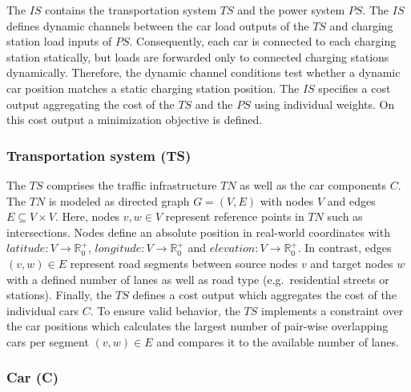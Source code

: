 The $IS$ contains the transportation system $TS$ and the power system $PS$. The $IS$ defines dynamic channels between the car load outputs of the $TS$ and charging station load inputs of $PS$. Consequently, each car is connected to each charging station statically, but loads are forwarded only to connected charging stations dynamically. Therefore, the dynamic channel conditions test whether a dynamic car position matches a static charging station position. The $IS$ specifies a cost output aggregating the cost of the $TS$ and the $PS$ using individual weights. On this cost output a minimization objective is defined.

\subsubsection*{Transportation system (TS)}

The $TS$ comprises the traffic infrastructure $TN$ as well as the car components $C$. The $TN$ is modeled as directed graph $G = (V,E)$ with nodes $V$ and edges $E \subseteq V \times V$. Here, nodes $v,w \in V$ represent reference points in $TN$ such as intersections. Nodes define an absolute position in real-world coordinates with 
$\mathit{latitude}: V \to \mathbb{R}_0^+$,
$\mathit{longitude}: V \to \mathbb{R}_0^+$ and
$\mathit{elevation}: V \to \mathbb{R}_0^+$.
In contrast, edges $(v,w) \in E$ represent road segments between source nodes $v$ and target nodes $w$ with a defined number of lanes as well as road type (e.g.\ residential streets or stations). Finally, the $TS$ defines a cost output which aggregates the cost of the individual cars $C$. To ensure valid behavior, the $TS$ implements a constraint over the car positions which calculates the largest number of pair-wise overlapping cars per segment $(v,w) \in E$ and compares it to the available number of lanes.

\subsubsection*{Car (C)}
\label{section:car}

